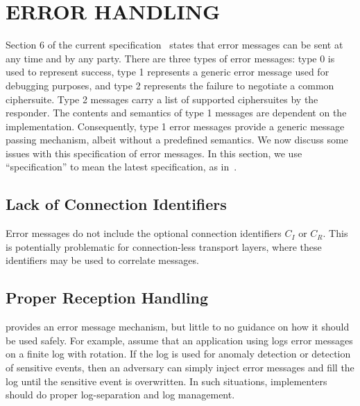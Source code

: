 \documentclass[runningheads]{llncs}
\newcommand{\mProtocolStyle}[1]{\text{#1}}
\newcommand{\mEdhoc}{\mProtocolStyle{EDHOC}}
\newcommand{\mCi}{\ensuremath{C_I}}
\newcommand{\mCr}{\ensuremath{C_R}}
\begin{document}
\section{\uppercase{Error Handling}}
\label{sec:errorHandling}
Section 6 of the current \mEdhoc{}
specification~\cite{draft-ietf-lake-edhoc-15}
states that error messages can be sent at any time and by any party.
%
There are three types of error messages: type 0 is used to represent success,
type 1 represents a generic error message used for debugging purposes, and
type 2 represents the failure to negotiate a common ciphersuite.
%
Type 2 messages carry a list of supported ciphersuites by the responder.
%
The contents and semantics of type 1 messages are dependent on the
implementation.
%
Consequently, type 1 error messages provide a generic message passing
mechanism, albeit without a predefined semantics.
%
We now discuss some issues with this specification of error messages.
%
In this section, we use ``specification'' to mean the latest specification, as
in~\cite{draft-ietf-lake-edhoc-15}.

\subsection{Lack of Connection Identifiers}
Error messages do not include the optional connection identifiers \mCi{} or
\mCr{}.
%
This is potentially problematic for connection-less transport layers, where
these identifiers may be used to correlate messages.

\subsection{Proper Reception Handling}
\mEdhoc{} provides an error message mechanism, but little to no guidance on
how it should be used safely.
%
For example, assume that an application using \mEdhoc{} logs error messages
on a finite log with rotation.
%
If the log is used for anomaly detection or detection of sensitive events, then
an adversary can simply inject error messages and fill the log until the
sensitive event is overwritten.
%
In such situations, implementers should do proper log-separation and log
management.
\end{document}
